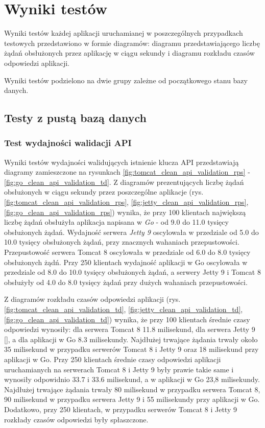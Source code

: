 \chapter{Wyniki testów}
Wyniki testów każdej aplikacji uruchamianej w poszczególnych przypadkach  testowych przedstawiono w formie diagramów: diagramu przedstawiającego liczbę żądań obsłużonych przez aplikację w ciągu sekundy i diagramu rozkładu czasów odpowiedzi aplikacji.

Wyniki testów podzielono na dwie grupy zależne  od początkowego stanu bazy danych.

\section{Testy z pustą bazą danych}

\subsection{Test wydajności walidacji API}
Wyniki testów wydajności walidujących istnienie klucza API przedstawiają diagramy zamieszczone na rysunkach \ref{fig:tomcat_clean_api_validation_rps} - \ref{fig:go_clean_api_validation_td}. 
Z diagramów prezentujących liczbę żądań obsłużonych w ciągu sekundy przez poszczególne aplikacje (rys. \ref{fig:tomcat_clean_api_validation_rps}, \ref{fig:jetty_clean_api_validation_rps}, \ref{fig:go_clean_api_validation_rps}) wynika, że przy 100 klientach największą liczbę żądań obsłużyła aplikacja napisana w \textsl{Go} - od 9.0 do 11.0 tysięcy obsłużonych żądań. Wydajność serwera \textsl{Jetty 9} oscylowała w przedziale od 5.0 do 10.0 tysięcy obsłużonych żądań, przy znacznych wahaniach przepustowości. Przepustowość serwera Tomcat 8 oscylowała w przedziale od 6.0 do 8.0 tysięcy obsłużonych żądń.  Przy 250 klientach wydajność aplikacji w Go oscylowała w przedziale od 8.0 do 10.0 tysięcy obsłużonych żądań, a serwery Jetty 9 i Tomcat 8 obsłużyły od 4.0 do 8.0 tysięcy żądań przy dużych wahaniach przepustowości.      

Z diagramów rozkładu czasów odpowiedzi aplikacji (rys. \ref{fig:tomcat_clean_api_validation_td}, \ref{fig:jetty_clean_api_validation_td}, \ref{fig:go_clean_api_validation_td}) wynika, że przy 100 klientach średnie czasy odpowiedzi wynosiły: dla serwera Tomcat 8 11.8 milisekund, dla serwera Jetty 9 [], a dla aplikacji w Go 8.3 milisekundy. Najdłużej trwające żądania trwały około 35 milisekund w przypadku serwerów Tomcat 8 i Jetty 9 oraz 18 milisekund przy aplikacji w Go.  Przy 250 klientach średnie czasy odpowiedzi aplikacji uruchamianych na serwerach Tomcat 8 i Jetty 9 były prawie takie same i wynosiły odpowidnio 33.7 i 33.6 milisekund, a w aplikacji w Go 23,8 milisekundy. Najdłużej trwające żądania trwały 80 milisekund w przypadku serwera Tomcat 8, 90 milisekund w przypadku serwera Jetty 9 i 55 milisekundy przy aplikacji w Go. Dodatkowo, przy 250 klientach, w przypadku serwerów Tomcat 8 i Jetty 9 rozkłady czasów odpowiedzi były spłaszczone. 

